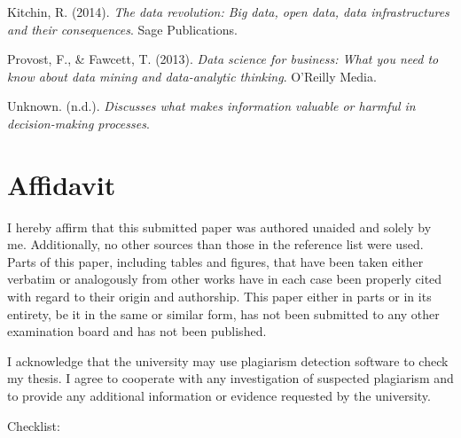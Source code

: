 \documentclass[
  man,
  floatsintext,
  longtable,
  nolmodern,
  notxfonts,
  notimes,
  colorlinks=true,linkcolor=blue,citecolor=blue,urlcolor=blue]{apa7}
\newlength{\cslhangindent}
\newenvironment{CSLReferences}[2] %
 {\begin{list}{}{%
  \setlength{\itemindent}{0pt}
  \setlength{\leftmargin}{0pt}
  \setlength{\parsep}{0pt}
  \ifodd #1
   \setlength{\leftmargin}{\cslhangindent}
   \setlength{\itemindent}{-1\cslhangindent}
  \fi
  \setlength{\itemsep}{#2\baselineskip}}}
 {\end{list}}
\begin{document}
\label{refs}
\begin{CSLReferences}{1}{0}
Kitchin, R. (2014). \emph{The data revolution: Big data, open data, data
infrastructures and their consequences}. Sage Publications.

Provost, F., \& Fawcett, T. (2013). \emph{Data science for business:
What you need to know about data mining and data-analytic thinking}.
O'Reilly Media.

Unknown. (n.d.). \emph{Discusses what makes information valuable or
harmful in decision-making processes}.

\end{CSLReferences}

\section{Affidavit}\label{affidavit}

I hereby affirm that this submitted paper was authored unaided and
solely by me. Additionally, no other sources than those in the reference
list were used. Parts of this paper, including tables and figures, that
have been taken either verbatim or analogously from other works have in
each case been properly cited with regard to their origin and
authorship. This paper either in parts or in its entirety, be it in the
same or similar form, has not been submitted to any other examination
board and has not been published.

I acknowledge that the university may use plagiarism detection software
to check my thesis. I agree to cooperate with any investigation of
suspected plagiarism and to provide any additional information or
evidence requested by the university.

Checklist:
\end{document}
